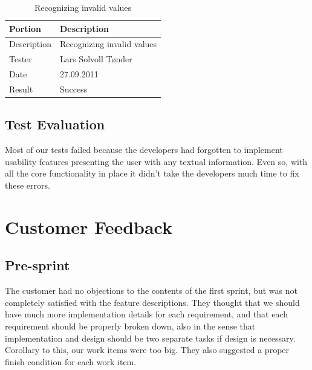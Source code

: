 \begin{table}[!ht] \footnotesize \center
\caption{Supporting configuration files \label{tab:sp1_tid06}}
\noindent{}
\end{table}

\begin{table}[!ht] \footnotesize \center
\caption{Recognizing invalid values \label{tab:sp1_tid07}}
\begin{tabular}{l l}
	\toprule
	Portion & Description \\
	\midrule
	Description &  Recognizing invalid values  \\
	Tester & Lars Solvoll Tønder \\
	Date & 27.09.2011 \\
	Result & Success\\
	\bottomrule
\end{tabular}
\end{table}

\subsection{Test Evaluation}
Most of our tests failed because the developers had forgotten to implement usability features presenting the user with any textual information. Even so, with all the core functionality in place it didn't take the developers much time to fix these errors.

\section{Customer Feedback}

\subsection{Pre-sprint}
The customer had no objections to the contents of the first sprint, but was not completely satisfied with the feature descriptions. They thought that we should have much more implementation details for each requirement, and that each requirement should be properly broken down, also in the sense that implementation and design should be two separate tasks if design is necessary. Corollary to this, our work items were too big. They also suggested a proper finish condition for each work item.
